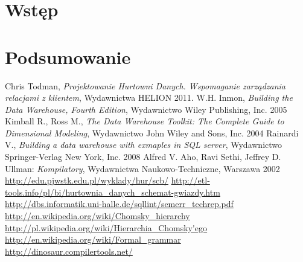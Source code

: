 \documentclass[a4paper,12pt]{ report}
\newcommand*\stdchapter{}
\let\stdchapter\chapter
\renewcommand*\chapter{%
\clearpage\ifodd\value{page}\else\mbox{}\clearpage\fi
\stdchapter}
\begin{document}


\tableofcontents
\setlength{\parskip}{2ex plus 0.5ex minus 0.5ex}


\chapter*{Wstęp}








  
\chapter*{Podsumowanie}


\listoffigures
{}

\renewcommand\lstlistlistingname{Listingi kodu}
\lstlistoflistings

\begin{thebibliography}{99}


Chris Todman, \textit{Projektowanie Hurtowni Danych. Wspomaganie zarządzania relacjami z klientem}, Wydawnictwa HELION 2011.
W.H. Inmon, \textit{Building the Data Warehouse, Fourth Edition}, Wydawnictwo Wiley Publishing, Inc. 2005
Kimball R., Ross M., \textit{ The Data Warehouse Toolkit: The Complete Guide to Dimensional Modeling}, Wydawnictwo John Wiley and Sons, Inc. 2004
 Rainardi V.,  \textit{Building a data warehouse with exmaples in SQL server}, Wydawnictwo  Springer-Verlag New York, Inc. 2008
  Alfred V. Aho, Ravi Sethi, Jeffrey D. Ullman: \textit{Kompilatory}, Wydawnictwa Naukowo-Techniczne, Warszawa 2002
   \url{http://edu.pjwstk.edu.pl/wyklady/hur/scb/}
   \url{http://etl-tools.info/pl/bi/hurtownia_danych_schemat-gwiazdy.htm}
   \url{http://dbs.informatik.uni-halle.de/sqllint/semerr_techrep.pdf}
   \url{http://en.wikipedia.org/wiki/Chomsky\_hierarchy}
   \url{http://pl.wikipedia.org/wiki/Hierarchia\_Chomsky'ego}
   \url{http://en.wikipedia.org/wiki/Formal_grammar}
  \url{http://dinosaur.compilertools.net/}


\end{thebibliography}
\end{document}
